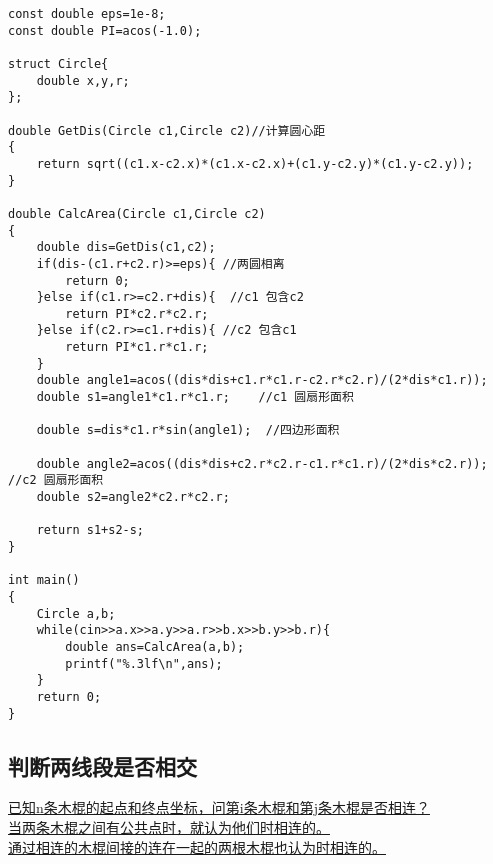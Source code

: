 \begin{lstlisting}
const double eps=1e-8;
const double PI=acos(-1.0);

struct Circle{
    double x,y,r;
};

double GetDis(Circle c1,Circle c2)//计算圆心距
{
    return sqrt((c1.x-c2.x)*(c1.x-c2.x)+(c1.y-c2.y)*(c1.y-c2.y));
}

double CalcArea(Circle c1,Circle c2)
{
    double dis=GetDis(c1,c2);
    if(dis-(c1.r+c2.r)>=eps){ //两圆相离
        return 0;
    }else if(c1.r>=c2.r+dis){  //c1 包含c2
        return PI*c2.r*c2.r;
    }else if(c2.r>=c1.r+dis){ //c2 包含c1
        return PI*c1.r*c1.r;
    }
    double angle1=acos((dis*dis+c1.r*c1.r-c2.r*c2.r)/(2*dis*c1.r));
    double s1=angle1*c1.r*c1.r;    //c1 圆扇形面积

    double s=dis*c1.r*sin(angle1);  //四边形面积

    double angle2=acos((dis*dis+c2.r*c2.r-c1.r*c1.r)/(2*dis*c2.r)); //c2 圆扇形面积
    double s2=angle2*c2.r*c2.r;

    return s1+s2-s;
}

int main()
{
    Circle a,b;
    while(cin>>a.x>>a.y>>a.r>>b.x>>b.y>>b.r){
        double ans=CalcArea(a,b);
        printf("%.3lf\n",ans);
    }
    return 0;
}
\end{lstlisting}

\subsection{判断两线段是否相交}

\underline {已知n条木棍的起点和终点坐标，问第i条木棍和第j条木棍是否相连？} \\
\underline{当两条木棍之间有公共点时，就认为他们时相连的。\\ 通过相连的木棍间接的连在一起的两根木棍也认为时相连的。} \\

